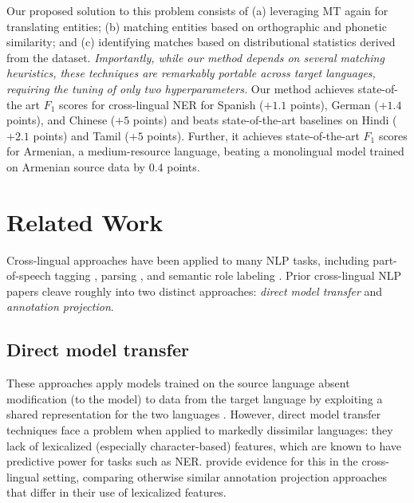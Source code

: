 \documentclass[11pt,a4paper]{article}
\begin{document}
Our proposed solution to this problem consists of
(a) leveraging MT again for translating entities;
(b) matching entities based on orthographic and phonetic similarity;
and (c) identifying matches based on distributional statistics derived from the dataset. 
\emph{Importantly, while our method depends on several matching heuristics,
these techniques are remarkably portable across target languages,
requiring the tuning of only two hyperparameters.}
Our method achieves state-of-the art $F_1$ scores for cross-lingual NER 
for Spanish ($+1.1$ points), German ($+1.4$ points), and Chinese ($+5$ points) 
and beats state-of-the-art baselines on Hindi ($+2.1$ points) and Tamil ($+5$ points). 
Further, it achieves state-of-the-art $F_1$ scores for Armenian, 
a medium-resource language, 
beating a monolingual model trained on Armenian source data by $0.4$ points.





















%
 \section{Related Work}
\label{sec:related-work}

Cross-lingual approaches have been applied to 
many NLP tasks, including part-of-speech tagging 
\citep{yarowsky2001inducing, xi2005backoff, das2011unsupervised, tackstrom2013token}, 
parsing \citep{hwa2005bootstrapping, zeman2008cross, smith2009parser, ganchev2009dependency}, 
and semantic role labeling 
\citep{tonelli2008frame, pado2009cross, kozhevnikov2013cross, kozhevnikov2014cross}. 
Prior cross-lingual NLP papers cleave roughly into 
two distinct approaches: 
\emph{direct model transfer} and \emph{annotation projection}. 

\subsection{Direct model transfer}
These approaches apply models trained on the source language 
absent modification (to the model) to data from the target language
by exploiting a shared representation for the two languages 
\citep{tackstrom2012cross, bharadwaj2016phonologically, chaudhary2018adapting, kozhevnikov2014cross, ni2017weakly}.
However, direct model transfer techniques 
face a problem when applied to markedly dissimilar languages: 
they lack of lexicalized (especially character-based) features, 
which are known to have predictive power for tasks such as NER. 
\citet{xie2018neural} provide evidence 
for this in the cross-lingual setting,
comparing otherwise similar annotation projection approaches
that differ in their use of lexicalized features.
\end{document}
